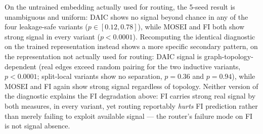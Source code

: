\documentclass[twocolumn]{article}
\begin{document}
\begin{table}[t]
    \centering
    \caption{Real graph neighbors vs.\ random pairing. ``Untrained embedding'' is the representation actually used to build every V0--V4 routing graph. ``Trained repr.'' recomputes the identical diagnostic on the corresponding trained checkpoint's own fused representation.}
    \label{tab:homophily_journal}
    \small
\end{table}

On the untrained embedding actually used for routing, the 5-seed result is unambiguous and uniform: DAIC shows no signal beyond chance in any of the four leakage-safe variants ($p \in [0.12, 0.78]$), while MOSEI and FI both show strong signal in every variant ($p<0.0001$). Recomputing the identical diagnostic on the trained representation instead shows a more specific secondary pattern, on the representation not actually used for routing: DAIC signal is graph-topology-dependent (real edges exceed random pairing for the two inductive variants, $p<0.0001$; split-local variants show no separation, $p{=}0.36$ and $p{=}0.94$), while MOSEI and FI again show strong signal regardless of topology. Neither version of the diagnostic explains the FI degradation above: FI carries strong real signal by both measures, in every variant, yet routing reportably \emph{hurts} FI prediction rather than merely failing to exploit available signal — the router's failure mode on FI is not signal absence.
\end{document}
